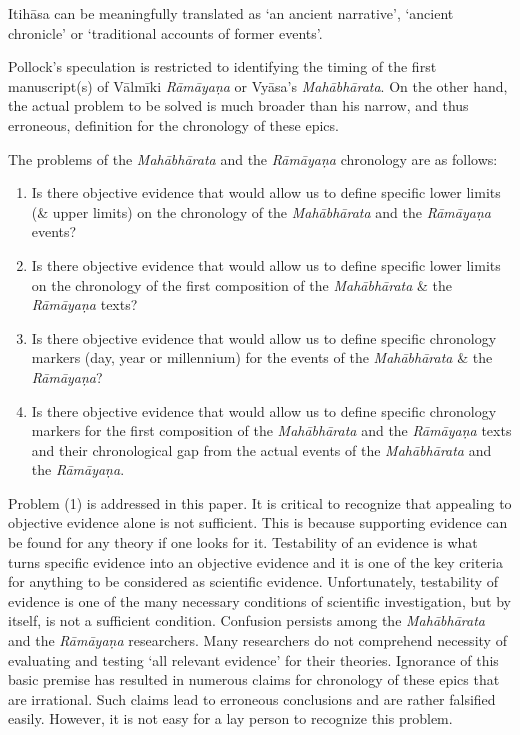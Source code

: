 Itihāsa can be meaningfully translated as ‘an ancient narrative’, ‘ancient chronicle’ or ‘traditional accounts of former events’.

Pollock’s speculation is restricted to identifying the timing of the first manuscript(s) of Vālmīki \textit{Rāmāyaṇa} or Vyāsa’s \textit{Mahābhārata}. On the other hand, the actual problem to be solved is much broader than his narrow, and thus erroneous, definition for the chronology of these epics.

The problems of the \textit{Mahābhārata} and the \textit{Rāmāyaṇa} chronology are as follows:

\begin{enumerate}
\item Is there objective evidence that would allow us to define specific lower limits (\& upper limits) on the chronology of the \textit{Mahābhārata} and the \textit{Rāmāyaṇa} events?

 \item Is there objective evidence that would allow us to define specific lower limits on the chronology of the first composition of the \textit{Mahābhārata} \& the \textit{Rāmāyaṇa} texts?

 \item Is there objective evidence that would allow us to define specific chronology markers (day, year or millennium) for the events of the \textit{Mahābhārata} \& the \textit{Rāmāyaṇa}?

 \item Is there objective evidence that would allow us to define specific chronology markers for the first composition of the \textit{Mahābhārata} and the \textit{Rāmāyaṇa} texts and their chronological gap from the actual events of the \textit{Mahābhārata} and the \textit{Rāmāyaṇa}.

\end{enumerate}

Problem (1) is addressed in this paper. It is critical to recognize that appealing to objective evidence alone is not sufficient. This is because supporting evidence can be found for any theory if one looks for it. Testability of an evidence is what turns specific evidence into an objective evidence and it is one of the key criteria for anything to be considered as scientific evidence. Unfortunately, testability of evidence is one of the many necessary conditions of scientific investigation, but by itself, is not a sufficient condition. Confusion persists among the \textit{Mahābhārata} and the \textit{Rāmāyaṇa} researchers. Many researchers do not comprehend necessity of evaluating and testing ‘all relevant evidence’ for their theories. Ignorance of this basic premise has resulted in numerous claims for chronology of these epics that are irrational. Such claims lead to erroneous conclusions and are rather falsified easily. However, it is not easy for a lay person to recognize this problem.

